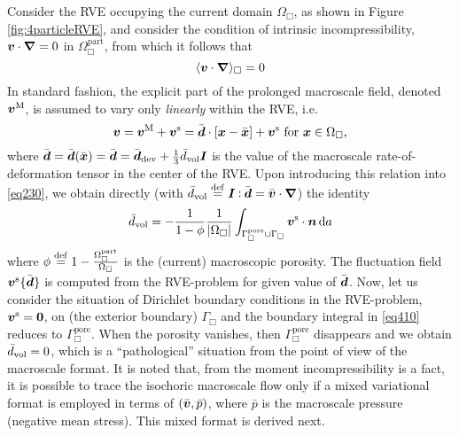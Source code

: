 \documentclass[10pt,a4paper]{article}
\newcommand{\pore}{\mathrm{pore}}
\newcommand{\particle}{\mathrm{part}}
\begin{document}
Consider the RVE occupying the current domain $\Omega_\Box$, as shown in Figure \ref{fig:4particleRVE}, and consider the condition of intrinsic incompressibility, $\boldsymbol{v}\cdot\boldsymbol{\nabla}=0$ in $\Omega_\Box^\particle$, from which it follows that
\begin{equation}
    \langle \boldsymbol{v}\cdot\boldsymbol{\nabla} \rangle_\Box  = 0
\label{eq230}
\end{equation}
In standard fashion, the explicit part of the prolonged macroscale field, denoted $\boldsymbol{v}^{\mathrm{M}}$, is assumed to vary only \emph{linearly} within the RVE, i.e.
\begin{equation}
    \boldsymbol{v} = \boldsymbol{v}^{\mathrm{M}} + \boldsymbol{v}^{\mathrm{s}} =
    \bar{\boldsymbol{d}} \cdot [\boldsymbol{x}-\bar{\boldsymbol{x}}] + \boldsymbol{v}^{\mathrm{s}} \mbox{ for }\boldsymbol{x}\in\Omega_\Box,
    \label{eq409}
\end{equation}
where $\bar{\boldsymbol{d}}=\bar{\boldsymbol{d}}(\bar{\boldsymbol{x}})=\bar{\boldsymbol{d}}=\bar{\boldsymbol{d}}_{\mathrm{dev}}+\frac{1}{3}\bar{d}_{\mathrm{vol}}\boldsymbol{I}$ is the value of the macroscale rate-of-deformation tensor in the center of the RVE. Upon introducing this relation into \eqref{eq230}, we obtain directly (with $\bar{d}_{\mathrm{vol}}\overset{\mathrm{def}}{=}\boldsymbol{I}\mathbin{\vcentcolon}\bar{\boldsymbol{d}}=\bar{\boldsymbol{v}}\cdot\boldsymbol{\nabla}$) the identity
\begin{equation}
    \bar{d}_\vol = - \frac{1}{1-\phi}\frac{1}{|\Omega_\Box|}\int_{\Gamma_\Box^\pore\cup\Gamma_\Box} \ta{v}^\fluct\cdot\ta{n} \dif a
    \label{eq410}
\end{equation}
where $\phi\defeq 1-\frac{\Omega_\Box^\particle}{\Omega_\Box}$ is the (current) macroscopic porosity. The fluctuation field $\boldsymbol{v}^{\mathrm{s}}\{\bar{\boldsymbol{d}}\}$ is computed from the RVE-problem for given value of $\bar{\boldsymbol{d}}$. Now, let us consider the situation of Dirichlet boundary conditions in the RVE-problem, $\boldsymbol{v}^{\mathrm{s}}=\boldsymbol{0}$, on (the exterior boundary) $\Gamma_\Box$ and the boundary integral in \eqref{eq410} reduces to $\Gamma_\Box^\pore$. When the porosity vanishes, then $\Gamma_\Box^\pore$ disappears and we obtain $\bar{d}_{\mathrm{vol}} = 0$, which is a ``pathological'' situation from the point of view of the macroscale format. It is noted that, from the moment incompressibility is a fact, it is possible to trace the isochoric macroscale flow only if a mixed variational format is employed in terms of $(\bar{\boldsymbol{v}},\bar{p})$, where $\bar{p}$ is the macroscale pressure (negative mean stress). This mixed format is derived next.
\end{document}
